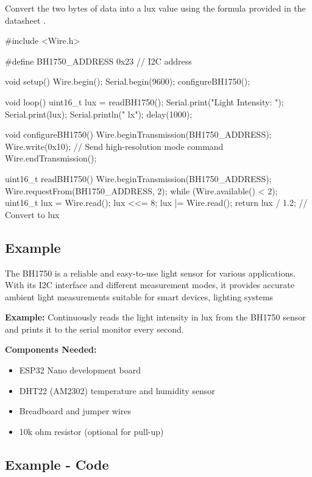 Convert the two bytes of data into a lux value using the formula provided in the datasheet \cite{Dewi:2022}.


\begin{Arduino}
	#include <Wire.h>
	
	#define BH1750_ADDRESS 0x23 // I2C address
	
	void setup() {
		Wire.begin();
		Serial.begin(9600);
		configureBH1750();
	}
	
	void loop() {
		uint16_t lux = readBH1750();
		Serial.print("Light Intensity: ");
		Serial.print(lux);
		Serial.println(" lx");
		delay(1000);
	}
	
	void configureBH1750() {
		Wire.beginTransmission(BH1750_ADDRESS);
		Wire.write(0x10); // Send high-resolution mode command
		Wire.endTransmission();
	}
	
	uint16_t readBH1750() {
		Wire.beginTransmission(BH1750_ADDRESS);
		Wire.requestFrom(BH1750_ADDRESS, 2);
		while (Wire.available() < 2);
		uint16_t lux = Wire.read();
		lux <<= 8;
		lux |= Wire.read();
		return lux / 1.2; // Convert to lux
	}
	
	
\end{Arduino}





\subsection{Example}

The BH1750 is a reliable and easy-to-use light sensor for various applications. With its I2C interface and different measurement modes, it provides accurate ambient light measurements suitable for smart devices, lighting systems

\textbf{Example:} \cite{Suryana:2020}Continuously reads the light intensity in lux from the BH1750 sensor and prints it to the serial monitor every second.


\textbf{Components Needed:}
\begin{itemize}
	\item ESP32 Nano development board
	\item DHT22 (AM2302) temperature and humidity sensor
	\item Breadboard and jumper wires
	\item 10k ohm resistor (optional for pull-up)
\end{itemize}




\subsection{Example - Code}

